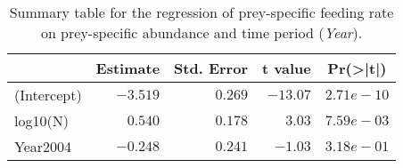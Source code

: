 \begin{table}[!htbp]
\caption{Summary table for the regression of prey-specific feeding rate 
  on prey-specific abundance and time period (\emph{Year}).\label{tab:FNY}} 
\begin{center}
\begin{tabular}{lrrrr}
\hline
\multicolumn{1}{l}{}&\multicolumn{1}{c}{Estimate}&\multicolumn{1}{c}{Std. Error}&\multicolumn{1}{c}{t value}&\multicolumn{1}{c}{Pr(\textgreater |t|)}\tabularnewline
\hline
(Intercept)&$-3.519$&$0.269$&$-13.07$&$2.71e-10$\tabularnewline
log10(N)&$ 0.540$&$0.178$&$  3.03$&$7.59e-03$\tabularnewline
Year2004&$-0.248$&$0.241$&$ -1.03$&$3.18e-01$\tabularnewline
\hline
\end{tabular}\end{center}
\end{table}
